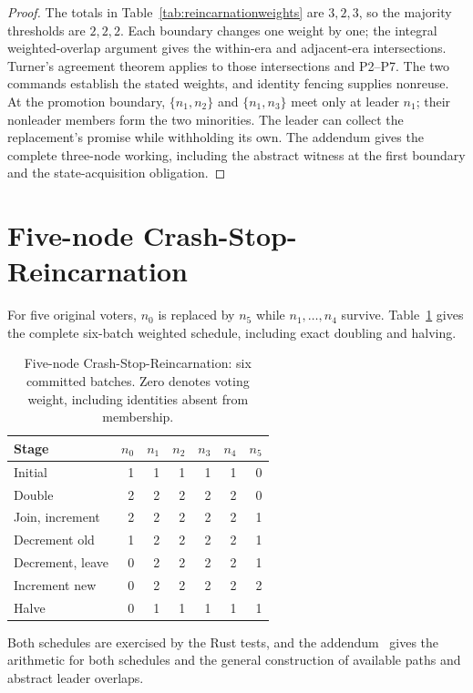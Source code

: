 \documentclass[10pt,journal,letterpaper]{IEEEtran}
\begin{document}
\begin{proof}
The totals in Table~\ref{tab:reincarnationweights} are $3,2,3$, so the majority thresholds are $2,2,2$. Each boundary changes one weight by one; the integral weighted-overlap argument gives the within-era and adjacent-era intersections. Turner's agreement theorem applies to those intersections and P2--P7. The two commands establish the stated weights, and identity fencing supplies nonreuse. At the promotion boundary, $\{n_1,n_2\}$ and $\{n_1,n_3\}$ meet only at leader $n_1$; their nonleader members form the two minorities. The leader can collect the replacement's promise while withholding its own. The addendum gives the complete three-node working, including the abstract witness at the first boundary and the state-acquisition obligation.
\end{proof}

\section{Five-node Crash-Stop-Reincarnation}\label{sec:five-node-reincarnation}
For five original voters, $n_0$ is replaced by $n_5$ while $n_1,\ldots,n_4$ survive. Table~\ref{tab:weights} gives the complete six-batch weighted schedule, including exact doubling and halving.

\begin{table}[t]
\centering
\caption{Five-node Crash-Stop-Reincarnation: six committed batches. Zero denotes voting weight, including identities absent from membership.}
\label{tab:weights}
\small
\begin{tabular}{lrrrrrr}
\toprule
Stage & $n_0$ & $n_1$ & $n_2$ & $n_3$ & $n_4$ & $n_5$\\
\midrule
Initial & 1&1&1&1&1&0\\
Double & 2&2&2&2&2&0\\
Join, increment & 2&2&2&2&2&1\\
Decrement old & 1&2&2&2&2&1\\
Decrement, leave & 0&2&2&2&2&1\\
Increment new & 0&2&2&2&2&2\\
Halve & 0&1&1&1&1&1\\
\bottomrule
\end{tabular}
\end{table}

Both schedules are exercised by the Rust tests, and the addendum~\cite{artifact} gives the arithmetic for both schedules and the general construction of available paths and abstract leader overlaps.
\end{document}
